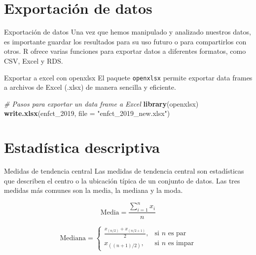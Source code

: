 \documentclass[
  ignorenonframetext,
]{beamer}
\newenvironment{Shaded}{\begin{snugshade}}{\end{snugshade}}
\newcommand{\AttributeTok}[1]{\textcolor[rgb]{0.13,0.29,0.53}{#1}}
\newcommand{\CommentTok}[1]{\textcolor[rgb]{0.56,0.35,0.01}{\textit{#1}}}
\newcommand{\FunctionTok}[1]{\textcolor[rgb]{0.13,0.29,0.53}{\textbf{#1}}}
\newcommand{\NormalTok}[1]{#1}
\newcommand{\StringTok}[1]{\textcolor[rgb]{0.31,0.60,0.02}{#1}}
\begin{document}
\section{Exportación de datos}\label{exportaciuxf3n-de-datos}

\begin{frame}{Exportación de datos}
\label{exportaciuxf3n-de-datos-1}
Una vez que hemos manipulado y analizado nuestros datos, es importante
guardar los resultados para su uso futuro o para compartirlos con otros.
R ofrece varias funciones para exportar datos a diferentes formatos,
como CSV, Excel y RDS.
\end{frame}

\begin{frame}[fragile]{Exportar a excel con openxlsx}
\label{exportar-a-excel-con-openxlsx}
El paquete \texttt{openxlsx} permite exportar data frames a archivos de
Excel (.xlsx) de manera sencilla y eficiente.

\begin{Shaded}
\begin{Highlighting}[]
\CommentTok{\# Pasos para exportar un data frame a Excel}
\FunctionTok{library}\NormalTok{(openxlsx)}
\FunctionTok{write.xlsx}\NormalTok{(enfct\_2019, }\AttributeTok{file =} \StringTok{"enfct\_2019\_new.xlsx"}\NormalTok{)}
\end{Highlighting}
\end{Shaded}
\end{frame}

\section{Estadística descriptiva}\label{estaduxedstica-descriptiva}

\begin{frame}{Medidas de tendencia central}
\label{medidas-de-tendencia-central}
Las medidas de tendencia central son estadísticas que describen el
centro o la ubicación típica de un conjunto de datos. Las tres medidas
más comunes son la media, la mediana y la moda.

\[
\text{Media} = \frac{\sum_{i=1}^{n} x_i}{n}
\]

\[
\text{Mediana} =
\begin{cases}
\frac{x_{(n/2)} + x_{(n/2 + 1)}}{2}, & \text{si } n \text{ es par} \\
x_{((n + 1)/2)}, & \text{si } n \text{ es impar}
\end{cases}
\]
\end{frame}
\end{document}
